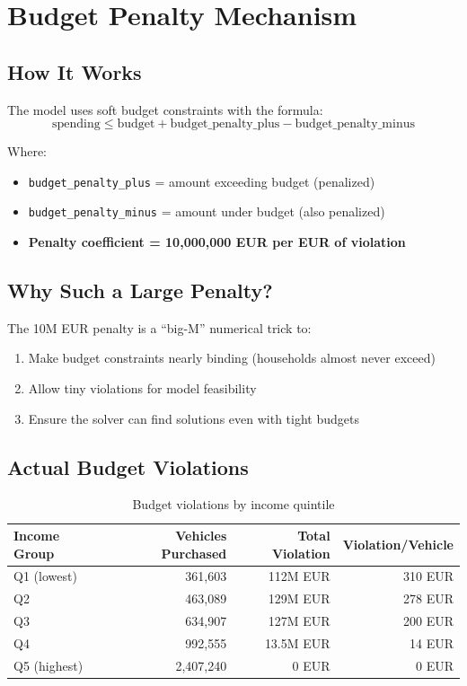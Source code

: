 \documentclass[11pt,a4paper]{article}
\begin{document}
\section{Budget Penalty Mechanism}

\subsection{How It Works}

The model uses soft budget constraints with the formula:
\begin{equation}
\text{spending} \leq \text{budget} + \text{budget\_penalty\_plus} - \text{budget\_penalty\_minus}
\end{equation}

Where:
\begin{itemize}
    \item \texttt{budget\_penalty\_plus} = amount exceeding budget (penalized)
    \item \texttt{budget\_penalty\_minus} = amount under budget (also penalized)
    \item \textbf{Penalty coefficient = 10,000,000 EUR per EUR of violation}
\end{itemize}

\subsection{Why Such a Large Penalty?}

The 10M EUR penalty is a ``big-M'' numerical trick to:
\begin{enumerate}
    \item Make budget constraints nearly binding (households almost never exceed)
    \item Allow tiny violations for model feasibility
    \item Ensure the solver can find solutions even with tight budgets
\end{enumerate}

\subsection{Actual Budget Violations} 

\begin{table}[h]
\centering
\begin{tabular}{lrrr}
\toprule
\textbf{Income Group} & \textbf{Vehicles Purchased} & \textbf{Total Violation} & \textbf{Violation/Vehicle} \\
\midrule
Q1 (lowest) & 361,603 & 112M EUR & 310 EUR \\
Q2 & 463,089 & 129M EUR & 278 EUR \\
Q3 & 634,907 & 127M EUR & 200 EUR \\
Q4 & 992,555 & 13.5M EUR & 14 EUR \\
Q5 (highest) & 2,407,240 & 0 EUR & 0 EUR \\
\bottomrule
\end{tabular}
\caption{Budget violations by income quintile}
\end{table}
\end{document}
